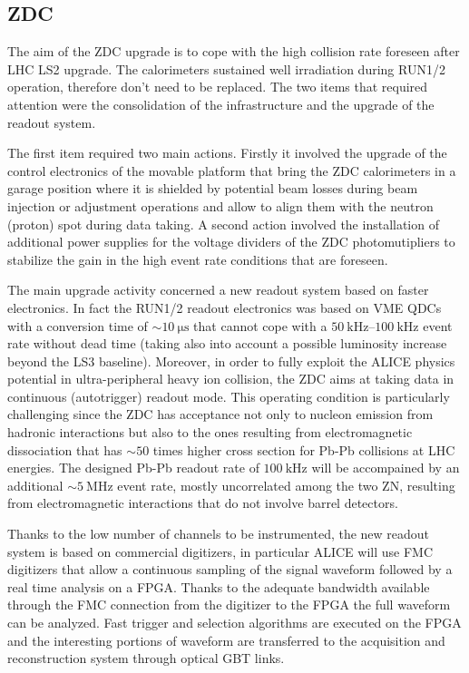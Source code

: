 \subsection{ZDC}

The aim of the ZDC upgrade is to cope with the high collision rate foreseen after LHC LS2 upgrade. The calorimeters sustained well irradiation during RUN1/2 operation, therefore don't need to be replaced. The two items that required attention were the consolidation of the infrastructure and the upgrade of the readout system.

The first item required two main actions. Firstly it involved the upgrade of the control electronics of the movable platform that bring the ZDC calorimeters in a garage position where it is shielded by potential beam losses during beam injection or adjustment operations and allow to align them with the neutron (proton) spot during data taking. A second action involved the installation of additional power supplies for the voltage dividers of the ZDC photomutipliers to stabilize the gain in the high event rate conditions that are foreseen. 

The main upgrade activity concerned a new readout system based on faster electronics. In fact the RUN1/2 readout electronics was based on VME QDCs with a conversion time of $\sim\SI{10}{\micro\second}$ that cannot cope with a $\SIrange[range-units=single,range-phrase=\div]{50}{100}{\kilo\hertz}$ event rate without dead time (taking also into account a possible luminosity increase beyond the LS3 baseline). Moreover, in order to fully exploit the ALICE physics potential in ultra-peripheral heavy ion collision, the ZDC aims at taking data in continuous (autotrigger) readout mode. This operating condition is particularly challenging since the ZDC has acceptance not only to nucleon emission from hadronic interactions but also to the ones resulting from electromagnetic dissociation \cite{Pshenichnov2001,Pshenichnov2011,ALICE:2012aa} that has $\sim 50$ times higher cross section for Pb-Pb collisions at LHC energies. The designed Pb-Pb readout rate of $\SI{100}{\kilo\hertz}$ will be accompained by an additional $\sim\SI{5}{\mega\hertz}$ event rate, mostly uncorrelated among the two ZN, resulting from electromagnetic interactions that do not involve barrel detectors.

Thanks to the low number of channels to be instrumented, the new readout system is based on commercial digitizers, in particular ALICE will use FMC digitizers that allow a continuous sampling of the signal waveform followed by a real time analysis on a FPGA. 
Thanks to the adequate bandwidth available through the FMC connection from the digitizer to the FPGA the full waveform can be analyzed. Fast trigger and selection algorithms are executed on the FPGA and the interesting portions of waveform are transferred to the acquisition and reconstruction system through optical GBT links.

